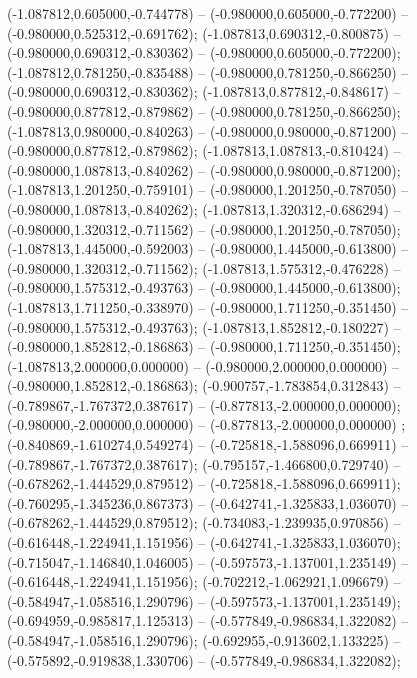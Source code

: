  (-1.087812,0.605000,-0.744778) -- (-0.980000,0.605000,-0.772200) -- (-0.980000,0.525312,-0.691762);
 (-1.087813,0.690312,-0.800875) -- (-0.980000,0.690312,-0.830362) -- (-0.980000,0.605000,-0.772200);
 (-1.087812,0.781250,-0.835488) -- (-0.980000,0.781250,-0.866250) -- (-0.980000,0.690312,-0.830362);
 (-1.087813,0.877812,-0.848617) -- (-0.980000,0.877812,-0.879862) -- (-0.980000,0.781250,-0.866250);
 (-1.087813,0.980000,-0.840263) -- (-0.980000,0.980000,-0.871200) -- (-0.980000,0.877812,-0.879862);
 (-1.087813,1.087813,-0.810424) -- (-0.980000,1.087813,-0.840262) -- (-0.980000,0.980000,-0.871200);
 (-1.087813,1.201250,-0.759101) -- (-0.980000,1.201250,-0.787050) -- (-0.980000,1.087813,-0.840262);
 (-1.087813,1.320312,-0.686294) -- (-0.980000,1.320312,-0.711562) -- (-0.980000,1.201250,-0.787050);
 (-1.087813,1.445000,-0.592003) -- (-0.980000,1.445000,-0.613800) -- (-0.980000,1.320312,-0.711562);
 (-1.087813,1.575312,-0.476228) -- (-0.980000,1.575312,-0.493763) -- (-0.980000,1.445000,-0.613800);
 (-1.087813,1.711250,-0.338970) -- (-0.980000,1.711250,-0.351450) -- (-0.980000,1.575312,-0.493763);
 (-1.087813,1.852812,-0.180227) -- (-0.980000,1.852812,-0.186863) -- (-0.980000,1.711250,-0.351450);
 (-1.087813,2.000000,0.000000) -- (-0.980000,2.000000,0.000000) -- (-0.980000,1.852812,-0.186863);
 (-0.900757,-1.783854,0.312843) -- (-0.789867,-1.767372,0.387617) -- (-0.877813,-2.000000,0.000000);
 (-0.980000,-2.000000,0.000000) -- (-0.877813,-2.000000,0.000000) ;
 (-0.840869,-1.610274,0.549274) -- (-0.725818,-1.588096,0.669911) -- (-0.789867,-1.767372,0.387617);
 (-0.795157,-1.466800,0.729740) -- (-0.678262,-1.444529,0.879512) -- (-0.725818,-1.588096,0.669911);
 (-0.760295,-1.345236,0.867373) -- (-0.642741,-1.325833,1.036070) -- (-0.678262,-1.444529,0.879512);
 (-0.734083,-1.239935,0.970856) -- (-0.616448,-1.224941,1.151956) -- (-0.642741,-1.325833,1.036070);
 (-0.715047,-1.146840,1.046005) -- (-0.597573,-1.137001,1.235149) -- (-0.616448,-1.224941,1.151956);
 (-0.702212,-1.062921,1.096679) -- (-0.584947,-1.058516,1.290796) -- (-0.597573,-1.137001,1.235149);
 (-0.694959,-0.985817,1.125313) -- (-0.577849,-0.986834,1.322082) -- (-0.584947,-1.058516,1.290796);
 (-0.692955,-0.913602,1.133225) -- (-0.575892,-0.919838,1.330706) -- (-0.577849,-0.986834,1.322082);
